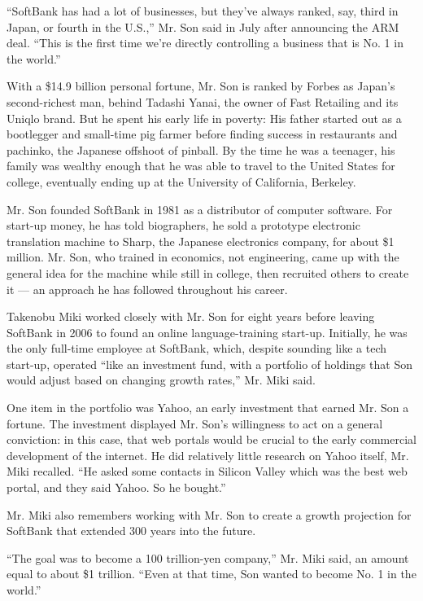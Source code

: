 ``SoftBank has had a lot of businesses, but they've always ranked, say,
third in Japan, or fourth in the U.S.,'' Mr. Son said in July after
announcing the ARM deal. ``This is the first time we're directly
controlling a business that is No. 1 in the world.''

With a \$14.9 billion personal fortune, Mr. Son is ranked by Forbes as
Japan's second-richest man, behind Tadashi Yanai, the owner of Fast
Retailing and its Uniqlo brand. But he spent his early life in poverty:
His father started out as a bootlegger and small-time pig farmer before
finding success in restaurants and pachinko, the Japanese offshoot of
pinball. By the time he was a teenager, his family was wealthy enough
that he was able to travel to the United States for college, eventually
ending up at the University of California, Berkeley.

Mr. Son founded SoftBank in 1981 as a distributor of computer software.
For start-up money, he has told biographers, he sold a prototype
electronic translation machine to Sharp, the Japanese electronics
company, for about \$1 million. Mr. Son, who trained in economics, not
engineering, came up with the general idea for the machine while still
in college, then recruited others to create it --- an approach he has
followed throughout his career.

Takenobu Miki worked closely with Mr. Son for eight years before leaving
SoftBank in 2006 to found an online language-training start-up.
Initially, he was the only full-time employee at SoftBank, which,
despite sounding like a tech start-up, operated ``like an investment
fund, with a portfolio of holdings that Son would adjust based on
changing growth rates,'' Mr. Miki said.

One item in the portfolio was Yahoo, an early investment that earned Mr.
Son a fortune. The investment displayed Mr. Son's willingness to act on
a general conviction: in this case, that web portals would be crucial to
the early commercial development of the internet. He did relatively
little research on Yahoo itself, Mr. Miki recalled. ``He asked some
contacts in Silicon Valley which was the best web portal, and they said
Yahoo. So he bought.''

Mr. Miki also remembers working with Mr. Son to create a growth
projection for SoftBank that extended 300 years into the future.

``The goal was to become a 100 trillion-yen company,'' Mr. Miki said, an
amount equal to about \$1 trillion. ``Even at that time, Son wanted to
become No. 1 in the world.''


